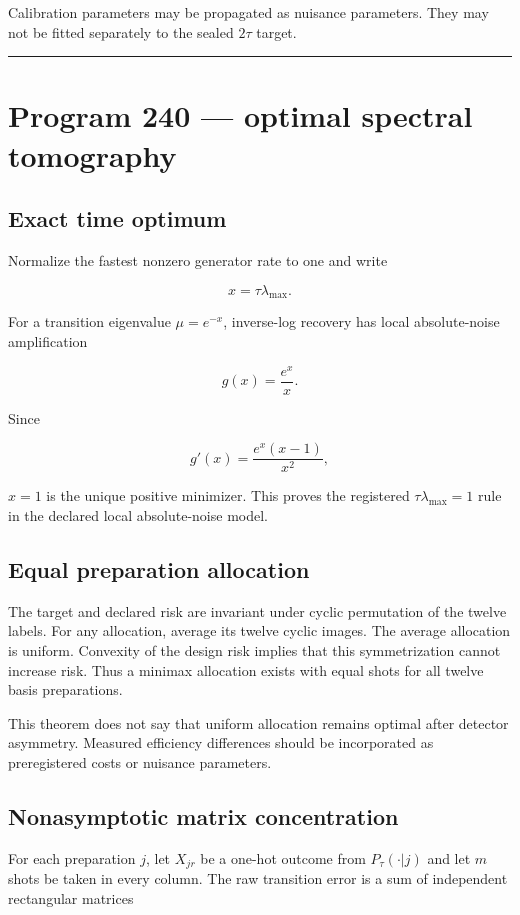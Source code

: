 \documentclass[11pt,a4paper,openany]{report}
\begin{document}
Calibration parameters may be propagated as nuisance parameters. They may not be fitted separately to the sealed \(2\tau\) target.

\par\medskip\hrule\medskip

\chapter{Program 240 --- optimal spectral tomography}

\section{Exact time optimum}

Normalize the fastest nonzero generator rate to one and write

\[
x=\tau\lambda_{\max}.
\]

For a transition eigenvalue \(\mu=e^{-x}\), inverse-log recovery has local absolute-noise amplification

\[
g(x)=\frac{e^x}{x}.
\]

Since

\[
g'(x)=\frac{e^x(x-1)}{x^2},
\]

\(x=1\) is the unique positive minimizer. This proves the registered \(\tau\lambda_{\max}=1\) rule in the declared local absolute-noise model.

\section{Equal preparation allocation}

The target and declared risk are invariant under cyclic permutation of the twelve labels. For any allocation, average its twelve cyclic images. The average allocation is uniform. Convexity of the design risk implies that this symmetrization cannot increase risk. Thus a minimax allocation exists with equal shots for all twelve basis preparations.

This theorem does not say that uniform allocation remains optimal after detector asymmetry. Measured efficiency differences should be incorporated as preregistered costs or nuisance parameters.

\section{Nonasymptotic matrix concentration}

For each preparation \(j\), let \(X_{jr}\) be a one-hot outcome from \(P_\tau(\cdot|j)\) and let \(m\) shots be taken in every column. The raw transition error is a sum of independent rectangular matrices
\end{document}

